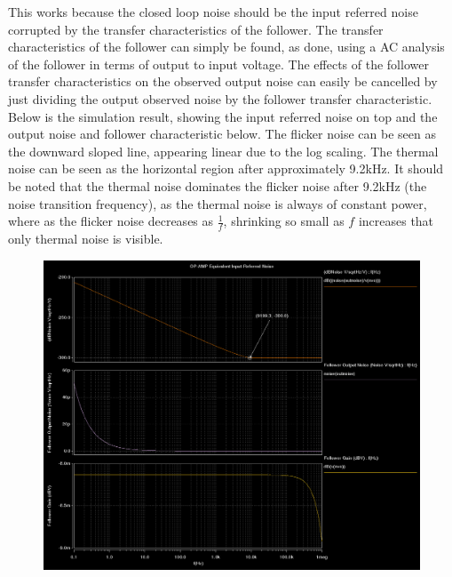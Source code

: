 \documentclass[12pt]{article}
\begin{document}
\FloatBarrier
\begin{figure}[h!]
  \begin{center}
    	\hspace*{0.5in}\resizebox{0.9\textwidth}{!}{}
  \end	{center}
\end {figure}
\FloatBarrier

This works because the closed loop noise should be the input referred noise corrupted by the transfer characteristics of the follower. The transfer characteristics of the follower can simply be found, as done, using a AC analysis of the follower in terms of output to input voltage. The effects of the follower transfer characteristics on the observed output noise can easily be cancelled by just dividing the output observed noise by the follower transfer characteristic. Below is the simulation result, showing the input referred noise on top and the output noise and follower characteristic below. The flicker noise can be seen as the downward sloped line, appearing linear due to the log scaling. The thermal noise can be seen as the horizontal region after approximately 9.2kHz. It should be noted that the thermal noise dominates the flicker noise after 9.2kHz (the noise transition frequency), as the thermal noise is always of constant power, where as the flicker noise decreases as $\frac{1}{f}$, shrinking so small as $f$ increases that only thermal noise is visible.
\FloatBarrier
\begin{figure}[h!]
\begin{center}
 \includegraphics[scale=0.3]{./ref_noise.png}
\end{center}
\end{figure}
\FloatBarrier
\end{document}
